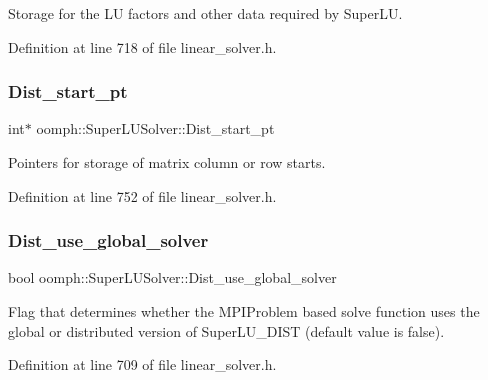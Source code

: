Storage for the LU factors and other data required by Super\+LU. 



Definition at line 718 of file linear\+\_\+solver.\+h.

\mbox{\label{classoomph_1_1SuperLUSolver_a7b5c61ed28e441622bfe3f623dee28b7}} 
\subsubsection{\texorpdfstring{Dist\+\_\+start\+\_\+pt}{Dist\_start\_pt}}
{\footnotesize\ttfamily int$\ast$ oomph\+::\+Super\+L\+U\+Solver\+::\+Dist\+\_\+start\+\_\+pt\hspace{0.3cm}{\ttfamily [private]}}



Pointers for storage of matrix column or row starts. 



Definition at line 752 of file linear\+\_\+solver.\+h.

\mbox{\label{classoomph_1_1SuperLUSolver_aab7193cb7f228dc57c4e6c237ea065ba}} 
\subsubsection{\texorpdfstring{Dist\+\_\+use\+\_\+global\+\_\+solver}{Dist\_use\_global\_solver}}
{\footnotesize\ttfamily bool oomph\+::\+Super\+L\+U\+Solver\+::\+Dist\+\_\+use\+\_\+global\+\_\+solver\hspace{0.3cm}{\ttfamily [private]}}



Flag that determines whether the M\+P\+I\+Problem based solve function uses the global or distributed version of Super\+L\+U\+\_\+\+D\+I\+ST (default value is false). 



Definition at line 709 of file linear\+\_\+solver.\+h.

